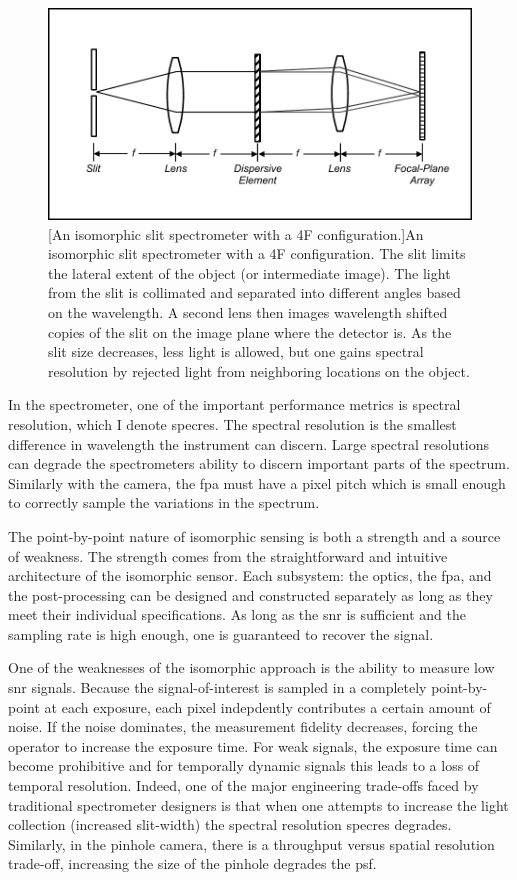 \begin{figure}
    \includegraphics[scale=1]{slitspectrometer}
    [An isomorphic slit spectrometer with a 4F configuration.]{An isomorphic slit spectrometer with a 4F configuration. The slit limits the lateral extent of the object (or intermediate image). The light from the slit is collimated and separated into different angles based on the wavelength. A second lens then images wavelength shifted copies of the slit on the image plane where the detector is. As the slit size decreases, less light is allowed, but one gains spectral resolution by rejected light from neighboring locations on the object. }
    \label{fig:slitspectrometer}
\end{figure}

In the spectrometer, one of the important performance metrics is \gls{spectral resolution}, which I denote \gls{specres}. The spectral resolution is the smallest difference in wavelength the instrument can discern. Large spectral resolutions can degrade the spectrometers ability to discern important parts of the spectrum. Similarly with the camera, the \gls{fpa} must have a \gls{pixel pitch} which is small enough to correctly sample the variations in the spectrum. 

The point-by-point nature of isomorphic sensing is both a strength and a source of weakness. The strength comes from the straightforward and intuitive architecture of the isomorphic sensor. Each subsystem: the optics, the \acrfull{fpa}, and the post-processing can be designed and constructed separately as long as they meet their individual specifications. As long as the \gls{snr} is sufficient and the sampling rate is high enough, one is guaranteed to recover the signal. 

One of the weaknesses of the isomorphic approach is the ability to measure low \gls{snr} signals. Because the signal-of-interest is sampled in a completely point-by-point at each exposure, each pixel indepdently contributes a certain amount of noise. If the noise dominates, the measurement fidelity decreases, forcing the operator to increase the exposure time. For weak signals, the exposure time can become prohibitive and for temporally dynamic signals this leads to a loss of temporal resolution. Indeed, one of the major engineering trade-offs faced by traditional spectrometer designers is that when one attempts to increase the light collection (increased slit-width) the spectral resolution \gls{specres} degrades. Similarly, in the pinhole camera, there is a throughput versus spatial resolution trade-off, increasing the size of the pinhole degrades the \gls{psf}.

